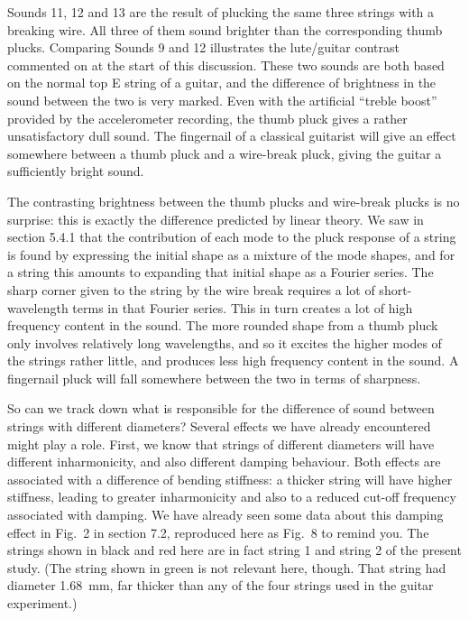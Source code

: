 
  Sounds 11, 12 and 13 are the result of plucking the same three strings with a 
  breaking wire. All three of them sound brighter than the corresponding thumb 
  plucks. Comparing Sounds 9 and 12 illustrates the lute/guitar contrast 
  commented on at the start of this discussion. These two sounds are both based 
  on the normal top E string of a guitar, and the difference of brightness in 
  the sound between the two is very marked. Even with the artificial “treble 
  boost” provided by the accelerometer recording, the thumb pluck gives a 
  rather unsatisfactory dull sound. The fingernail of a classical guitarist 
  will give an effect somewhere between a thumb pluck and a wire-break pluck, 
  giving the guitar a sufficiently bright sound. 

  The contrasting brightness between the thumb plucks and wire-break plucks is 
  no surprise: this is exactly the difference predicted by linear theory. We 
  saw in section 5.4.1 that the contribution of each mode to the pluck response 
  of a string is found by expressing the initial shape as a mixture of the mode 
  shapes, and for a string this amounts to expanding that initial shape as a 
  Fourier series. The sharp corner given to the string by the wire break 
  requires a lot of short-wavelength terms in that Fourier series. This in turn 
  creates a lot of high frequency content in the sound. The more rounded shape 
  from a thumb pluck only involves relatively long wavelengths, and so it 
  excites the higher modes of the strings rather little, and produces less high 
  frequency content in the sound. A fingernail pluck will fall somewhere 
  between the two in terms of sharpness. 




  So can we track down what is responsible for the difference of sound between 
  strings with different diameters? Several effects we have already encountered 
  might play a role. First, we know that strings of different diameters will 
  have different inharmonicity, and also different damping behaviour. Both 
  effects are associated with a difference of bending stiffness: a thicker 
  string will have higher stiffness, leading to greater inharmonicity and also 
  to a reduced cut-off frequency associated with damping. We have already seen 
  some data about this damping effect in Fig.\ 2 in section 7.2, reproduced 
  here as Fig.\ 8 to remind you. The strings shown in black and red here are in 
  fact string 1 and string 2 of the present study. (The string shown in green 
  is not relevant here, though. That string had diameter 1.68~mm, far thicker 
  than any of the four strings used in the guitar experiment.) 

